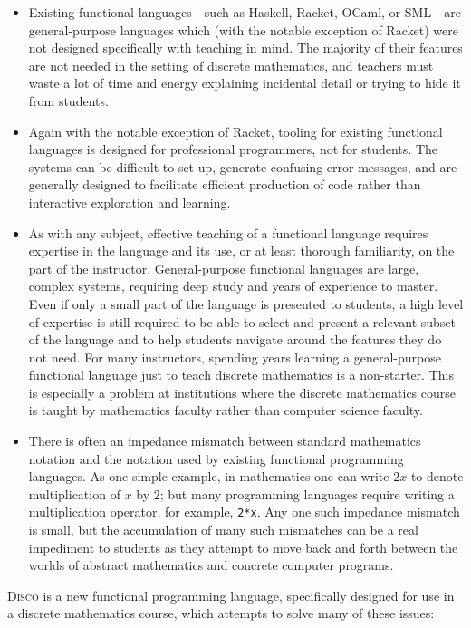 \documentclass[submission,copyright,creativecommons]{eptcs}
\newcommand{\disco}{\textsc{Disco}\xspace}
\begin{document}
\begin{itemize}
\item Existing functional languages---such as Haskell, Racket, OCaml,
  or SML---are general-purpose languages which (with the notable
  exception of Racket) were not designed specifically with teaching in
  mind.  The majority of their features are not needed in the setting
  of discrete mathematics, and teachers must waste a lot of time and
  energy explaining incidental detail or trying to hide it from
  students.
\item Again with the notable exception of Racket, tooling for existing
  functional languages is designed for professional programmers, not
  for students.  The systems can be difficult to set up, generate
  confusing error messages, and are generally designed to facilitate
  efficient production of code rather than interactive exploration and
  learning.
\item As with any subject, effective teaching of a functional language
  requires expertise in the language and its use, or at least thorough
  familiarity, on the part of the instructor. General-purpose
  functional languages are large, complex systems, requiring deep
  study and years of experience to master.  Even if only a small part
  of the language is presented to students, a high level of expertise
  is still required to be able to select and present a relevant subset
  of the language and to help students navigate around the features
  they do not need.  For many instructors, spending years learning a
  general-purpose functional language just to teach discrete
  mathematics is a non-starter.  This is especially a problem at
  institutions where the discrete mathematics course is taught by
  mathematics faculty rather than computer science faculty.
\item There is often an impedance mismatch between standard
  mathematics notation and the notation used by existing functional
  programming languages.  As one simple example, in mathematics one
  can write $2x$ to denote multiplication of $x$ by $2$; but many
  programming languages require writing a multiplication operator, for
  example, \texttt{2*x}.  Any one such impedance mismatch is small,
  but the accumulation of many such mismatches can be a real
  impediment to students as they attempt to move back and forth
  between the worlds of abstract mathematics and concrete computer
  programs.
\end{itemize}

\disco is a new functional programming language, specifically designed
for use in a discrete mathematics course, which attempts to solve many
of these issues:
\end{document}
